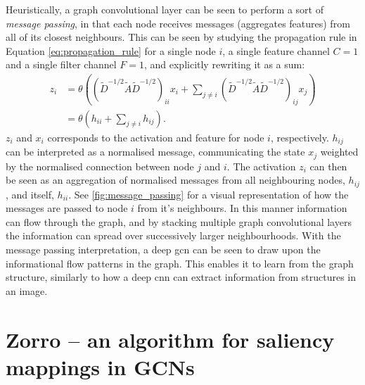 Heuristically, a graph convolutional layer can be seen to perform a sort of \textit{message passing}, in that each node receives messages (aggregates features) from all of its closest neighbours. This can be seen by studying the propagation rule in Equation \eqref{eq:propagation_rule} for a single node $i$, a single feature channel $C=1$ and a single filter channel $F=1$, and explicitly rewriting it as a sum:
\begin{equation}
\begin{split}
    z_i &= \theta \left(\left(\tilde{D}^{-1/2} \tilde{A} \tilde{D}^{-1/2}\right)_{ii} x_{i} + \sum_{j \neq i} \left(\tilde{D}^{-1/2} \tilde{A} \tilde{D}^{-1/2}\right)_{ij} x_{j} \right) \\
    &=
    \theta \left(h_{ii} + \sum_{j \neq i} h_{ij} \right).
\end{split}
\end{equation}
$z_i$ and $x_i$ corresponds to the activation and feature for node $i$, respectively. $h_{ij}$ can be interpreted as a normalised message, communicating the state $x_j$ weighted by the normalised connection between node $j$ and $i$. The activation $z_i$ can then be seen as an aggregation of normalised messages from all neighbouring nodes, $h_{ij}$, and itself, $h_{ii}$. See \cref{fig:message_passing} for a visual representation of how the messages are passed to node $i$ from it's neighbours. In this manner information can flow through the graph, and by stacking multiple graph convolutional layers the information can spread over successively larger neighbourhoods. With the message passing interpretation, a deep \acrshort{gcn} can be seen to draw upon the informational flow patterns in the graph. This enables it to learn from the graph structure, similarly to how a deep \acrshort{cnn} can extract information from structures in an image.



\section{Zorro -- an algorithm for saliency mappings in GCNs}
\label{sec:zorro}

